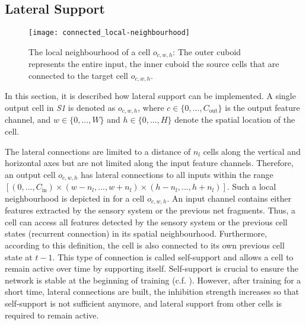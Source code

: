 \subsection{Lateral Support}
\begin{figure}[h]
    \centering
    \texttt{[image: connected\_local-neighbourhood]}
    \caption[The local neighbourhood of a cell $o_{c,w,h}$]{The local neighbourhood of a cell $o_{c,w,h}$: The outer cuboid represents the entire input, the inner cuboid the source cells that are connected to the target cell $o_{c,w,h}$.}
\end{figure}
%
In this section, it is described how lateral support can be implemented.
A single output cell in \emph{S1} is denoted as $o_{c,w,h}$, where $c \in \{0, ..., C_{\text{out}}\}$ is the output feature channel, and $w \in \{0, ..., W\}$ and $h \in \{0, ..., H\}$ denote the spatial location of the cell.

The lateral connections are limited to a distance of $n_{l}$ cells along the vertical and horizontal axes but are not limited along the input feature channels.
Therefore, an output cell $o_{c,w,h}$ has lateral connections to all inputs within the range $\left[(0, ..., C_{\text{in}}) \times (w - n_l, ..., w+n_l) \times (h - n_l, ..., h+n_l)\right]$.
Such a local neighbourhood is depicted in  for a cell $o_{c,w,h}$.
An input channel contains either features extracted by the sensory system or the previous net fragments. Thus, a cell can access all features detected by the sensory system or the previous cell states (recurrent connection) in its spatial neighbourhood.
Furthermore, according to this definition, the cell is also connected to its own previous cell state at $t-1$.
This type of connection is called self-support and allows a cell to remain active over time by supporting itself.
Self-support is crucial to ensure the network is stable at the beginning of training (c.f. ). However, after training for a short time, lateral connections are built, the inhibition strength increases so that self-support is not sufficient anymore, and lateral support from other cells is required to remain active.

